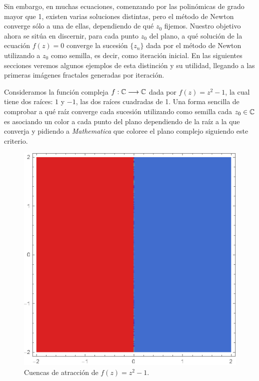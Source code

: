 Sin embargo, en muchas ecuaciones, comenzando por las polinómicas de grado mayor que 1, existen varias soluciones distintas, pero el método de Newton converge sólo a una de ellas, dependiendo de qué $z_0$ fijemos. Nuestro objetivo ahora se sitúa en discernir, para cada punto $z_0$ del plano, a qué solución de la ecuación $f(z)=0$ converge la sucesión $\{z_n\}$ dada por el método de Newton utilizando a $z_0$ como semilla, es decir, como iteración inicial. En las siguientes secciones veremos algunos ejemplos de esta distinción y su utilidad, llegando a las primeras imágenes fractales generadas por iteración.

\begin{ejemplo}
\label{ejemplo:cuencas-1}
Consideramos la función compleja $f:\mathbb{C}\longrightarrow\mathbb{C}$ dada por $f(z)=z^2-1$, la cual tiene dos raíces: $1$ y $-1$, las dos raíces cuadradas de 1. Una forma sencilla de comprobar a qué raíz converge cada sucesión utilizando como semilla cada $z_0\in\mathbb{C}$ es asociando un color a cada punto del plano dependiendo de la raíz a la que converja y pidiendo a \textit{Mathematica} que coloree el plano complejo siguiendo este criterio.


\begin{figure} [ht]
\centering
\includegraphics[scale = 0.4]{img/C2/cuencas-1.png}
\caption{Cuencas de atracción de $f(z)=z^2-1$.}
    \label{fig:cuencas-1}
\end{figure}


\end{ejemplo}
